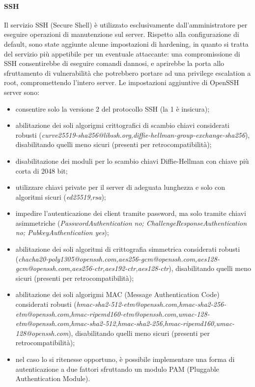 \paragraph{SSH}
Il servizio SSH (Secure Shell) è utilizzato esclusivamente dall'amministratore per eseguire operazioni di manutenzione sul server.
Rispetto alla configurazione di default, sono state aggiunte alcune impostazioni di hardening, in quanto si tratta del servizio più appetibile per un eventuale attaccante: una compromissione di SSH consentirebbe di eseguire comandi dannosi, e aprirebbe la porta allo sfruttamento di vulnerabilità che potrebbero portare ad una privilege escalation a root, compromettendo l'intero server.
Le impostazioni aggiuntive di OpenSSH server sono:
\begin{itemize}
 \item consentire solo la versione 2 del protocollo SSH (la 1 è insicura);
 \item abilitazione dei soli algorigmi crittografici di scambio chiavi considerati robusti (\textit{curve25519-sha256@libssh.org,diffie-hellman-group-exchange-sha256}), disabilitando quelli meno sicuri (presenti per retrocompatibilità);
 \item disabilitazione dei moduli per lo scambio chiavi Diffie-Hellman con chiave più corta di 2048 bit;
 \item utilizzare chiavi private per il server di adeguata lunghezza e solo con algoritmi sicuri (\textit{ed25519,rsa});
 \item impedire l'autenticazione dei client tramite password, ma solo tramite chiavi asimmetriche (\textit{PasswordAuthentication no; ChallengeResponseAuthentication no; PubkeyAuthentication yes});
 \item abilitazione dei soli algoritmi di crittografia simmetrica considerati robusti (\textit{chacha20-poly1305@openssh.com,aes256-gcm@openssh.com,aes128-gcm@openssh.com,aes256-ctr,aes192-ctr,aes128-ctr}), disabilitando quelli meno sicuri (presenti per retrocompatibilità);
 \item abilitazione dei soli algorigmi MAC (Message Authentication Code) considerati robusti (\textit{hmac-sha2-512-etm@openssh.com,hmac-sha2-256-etm@openssh.com,hmac-ripemd160-etm@openssh.com,umac-128-etm@openssh.com,hmac-sha2-512,hmac-sha2-256,hmac-ripemd160,umac-128@openssh.com}), disabilitando quelli meno sicuri (presenti per retrocompatibilità);
 \item nel caso lo si ritenesse opportuno, è possibile implementare una forma di autenticazione a due fattori sfruttando un modulo PAM (Pluggable Authentication Module).
\end{itemize}

